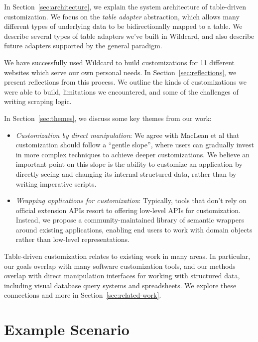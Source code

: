 \documentclass[sigplan,screen,10pt,anonymous,review]{acmart}
\providecommand{\tightlist}{%
  \setlength{\itemsep}{0pt}\setlength{\parskip}{0pt}}
\begin{document}
In Section~\ref{sec:architecture}, we explain the system architecture of
table-driven customization. We focus on the \emph{table adapter}
abstraction, which allows many different types of underlying data to be
bidirectionally mapped to a table. We describe several types of table
adapters we've built in Wildcard, and also describe future adapters
supported by the general paradigm.

We have successfully used Wildcard to build customizations for 11
different websites which serve our own personal needs. In
Section~\ref{sec:reflections}, we present reflections from this process.
We outline the kinds of customizations we were able to build,
limitations we encountered, and some of the challenges of writing
scraping logic.

In Section~\ref{sec:themes}, we discuss some key themes from our work:

\begin{itemize}
\tightlist
\item
  \emph{Customization by direct manipulation}: We agree with MacLean et
  al \citep{maclean1990} that customization should follow a ``gentle
  slope'', where users can gradually invest in more complex techniques
  to achieve deeper customizations. We believe an important point on
  this slope is the ability to customize an application by directly
  seeing and changing its internal structured data, rather than by
  writing imperative scripts.
\item
  \emph{Wrapping applications for customization}: Typically, tools that
  don't rely on official extension APIs resort to offering low-level
  APIs for customization. Instead, we propose a community-maintained
  library of semantic wrappers around existing applications, enabling
  end users to work with domain objects rather than low-level
  representations.
\end{itemize}

Table-driven customization relates to existing work in many areas. In
particular, our goals overlap with many software customization tools,
and our methods overlap with direct manipulation interfaces for working
with structured data, including visual database query systems and
spreadsheets. We explore these connections and more in
Section~\ref{sec:related-work}.

\hypertarget{sec:example}{%
\section{Example Scenario}\label{sec:example}}
\end{document}
